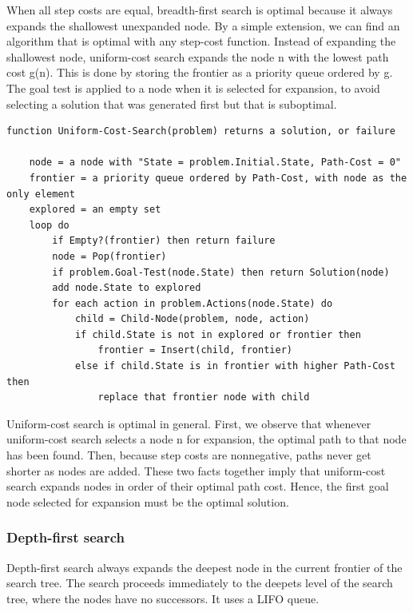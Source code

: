 \documentclass{article}
\begin{document}
When all step costs are equal, breadth-first search is optimal because it always expands the shallowest unexpanded node. By a simple extension, we can find an algorithm that is optimal with any step-cost function. Instead of expanding the shallowest node, uniform-cost search expands the node n with the lowest path cost g(n). This is done by storing the frontier as a priority queue ordered by g. The goal test is applied to a node when it is selected for expansion, to avoid selecting a solution that was generated first but that is suboptimal.

\begin{lstlisting}[caption = Uniform-cost search on a graph.]
function Uniform-Cost-Search(problem) returns a solution, or failure

    node = a node with "State = problem.Initial.State, Path-Cost = 0"
    frontier = a priority queue ordered by Path-Cost, with node as the only element
    explored = an empty set 
    loop do 
        if Empty?(frontier) then return failure 
        node = Pop(frontier)
        if problem.Goal-Test(node.State) then return Solution(node)
        add node.State to explored 
        for each action in problem.Actions(node.State) do 
            child = Child-Node(problem, node, action)
            if child.State is not in explored or frontier then 
                frontier = Insert(child, frontier)
            else if child.State is in frontier with higher Path-Cost then 
                replace that frontier node with child 
\end{lstlisting}

Uniform-cost search is optimal in general. First, we observe that whenever uniform-cost search selects a node n for expansion, the optimal path to that node has been found. Then, because step costs are nonnegative, paths never get shorter as nodes are added. These two facts together imply that uniform-cost search expands nodes in order of their optimal path cost. Hence, the first goal node selected for expansion must be the optimal solution. 

\subsubsection{Depth-first search}

Depth-first search always expands the deepest node in the current frontier of the search tree. The search proceeds immediately to the deepets level of the search tree, where the nodes have no successors. It uses a LIFO queue.
\end{document}
